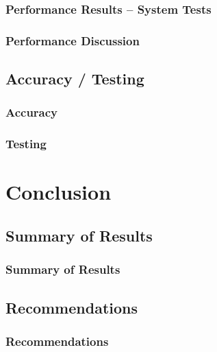 \documentclass{beamer}
\begin{document}
\begin{frame}
\frametitle{Performance Results -- System Tests}
\end{frame}

\begin{frame}
\frametitle{Performance Discussion}
\end{frame}

\subsection{Accuracy / Testing}
\begin{frame}
\frametitle{Accuracy}
\end{frame}

\begin{frame}
\frametitle{Testing}
\end{frame}

\section{Conclusion}
\subsection{Summary of Results}
\begin{frame}
\frametitle{Summary of Results}
\end{frame}

\subsection{Recommendations}
\begin{frame}
\frametitle{Recommendations}
\end{frame}
\end{document}
